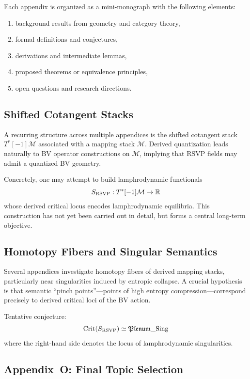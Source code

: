 \documentclass[12pt]{article}
\theoremstyle{plain}
\theoremstyle{definition}
\theoremstyle{remark}
\begin{document}
Each appendix is organized as a mini-monograph with the following elements:
\begin{enumerate}
    \item background results from geometry and category theory,
    \item formal definitions and conjectures,
    \item derivations and intermediate lemmas,
    \item proposed theorems or equivalence principles,
    \item open questions and research directions.
\end{enumerate}


\subsection{Shifted Cotangent Stacks}

A recurring structure across multiple appendices is the shifted cotangent
stack $T^\ast[-1]\mathcal{M}$ associated with a mapping stack $\mathcal{M}$.
Derived quantization leads naturally to BV operator constructions on
$\mathcal{M}$, implying that RSVP fields may admit a quantized BV geometry.

Concretely, one may attempt to build lamphrodynamic functionals
\[
    S_{\rm RSVP} : T^\ast[-1]\mathcal{M} \to \mathbb{R}
\]
whose derived critical locus encodes lamphrodynamic equilibria. This
construction has not yet been carried out in detail, but forms a central
long-term objective.


\subsection{Homotopy Fibers and Singular Semantics}

Several appendices investigate homotopy fibers of derived mapping stacks,
particularly near singularities induced by entropic collapse. A crucial
hypothesis is that semantic ``pinch points''---points of high entropy
compression---correspond precisely to derived critical loci of the BV action.

Tentative conjecture:
\[
    \mathrm{Crit}(S_{\rm RSVP}) \simeq
    \mathfrak{Plenum}\_{\rm Sing}
\]
where the right-hand side denotes the locus of lamphrodynamic singularities.


\subsection{Appendix~O: Final Topic Selection}
\end{document}
